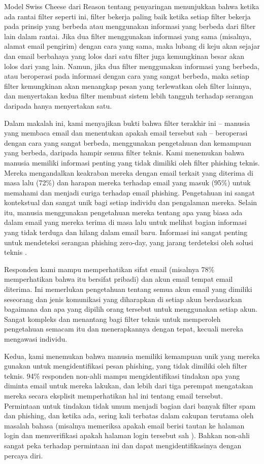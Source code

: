 \documentclass[lettersize,journal]{IEEEtran}
\begin{document}
Model Swiss Cheese dari Reason tentang penyaringan \cite{duadelapan}
menunjukkan bahwa ketika ada rantai filter seperti ini, filter bekerja paling
baik ketika setiap filter bekerja pada prinsip yang berbeda atau menggunakan
informasi yang berbeda dari filter lain dalam rantai. Jika dua filter
menggunakan informasi yang sama (misalnya, alamat email pengirim) dengan cara
yang sama, maka lubang di keju akan sejajar dan email berbahaya yang lolos dari
satu filter juga kemungkinan besar akan lolos dari yang lain. Namun, jika dua
filter menggunakan informasi yang berbeda, atau beroperasi pada informasi
dengan cara yang sangat berbeda, maka setiap filter kemungkinan akan menangkap
pesan yang terlewatkan oleh filter lainnya, dan menyertakan kedua filter
membuat sistem lebih tangguh terhadap serangan daripada hanya menyertakan satu.

Dalam makalah ini, kami menyajikan bukti bahwa filter terakhir ini – manusia
yang membaca email dan menentukan apakah email tersebut sah – beroperasi dengan
cara yang sangat berbeda, menggunakan pengetahuan dan kemampuan yang berbeda,
daripada hampir semua filter teknis. Kami menemukan bahwa manusia memiliki
informasi penting yang tidak dimiliki oleh filter phishing teknis. Mereka
mengandalkan keakraban mereka dengan email terkait yang diterima di masa lalu
(72\%) dan harapan mereka terhadap email yang masuk (95\%) untuk memahami dan
menjadi curiga terhadap email phishing. Pengetahuan ini sangat kontekstual dan
sangat unik bagi setiap individu dan pengalaman mereka. Selain itu, manusia
menggunakan pengetahuan mereka tentang apa yang biasa ada dalam email yang
mereka terima di masa lalu untuk melihat bagian informasi yang tidak terduga
dan hilang dalam email baru. Informasi ini sangat penting untuk mendeteksi
serangan phishing zero-day, yang jarang terdeteksi oleh solusi teknis
\cite{satudua}.

Responden kami mampu memperhatikan sifat email (misalnya 78\% memperhatikan
bahwa itu bersifat pribadi) dan akun email tempat email diterima. Ini
memerlukan pengetahuan tentang semua akun email yang dimiliki seseorang dan
jenis komunikasi yang diharapkan di setiap akun berdasarkan bagaimana dan apa
yang dipilih orang tersebut untuk menggunakan setiap akun. Sangat kompleks dan
menantang bagi filter teknis untuk memperoleh pengetahuan semacam itu dan
menerapkannya dengan tepat, kecuali mereka mengawasi individu.

Kedua, kami menemukan bahwa manusia memiliki kemampuan unik yang mereka gunakan
untuk mengidentifikasi pesan phishing, yang tidak dimiliki oleh filter teknis.
94\% responden non-ahli mampu mengidentifikasi tindakan apa yang diminta email
untuk mereka lakukan, dan lebih dari tiga perempat mengatakan mereka secara
eksplisit memperhatikan hal ini tentang email tersebut. Permintaan untuk
tindakan tidak umum menjadi bagian dari banyak filter spam dan phishing, dan
ketika ada, sering kali terbatas dalam cakupan terutama oleh masalah bahasa
(misalnya memeriksa apakah email berisi tautan ke halaman login dan
memverifikasi apakah halaman login tersebut sah \cite{duatiga}). Bahkan
non-ahli sangat peka terhadap permintaan ini dan dapat mengidentifikasinya
dengan percaya diri.
\end{document}
